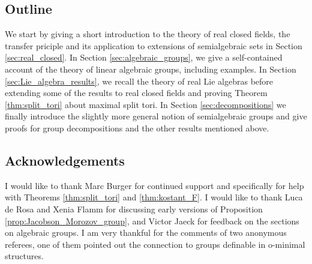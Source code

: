 \documentclass[12pt]{amsart}
\numberwithin{equation}{section}
\theoremstyle{remark} %
\begin{document}
	
	\subsection{Outline}
	We start by giving a short introduction to the theory of real closed fields, the transfer priciple and its application to extensions of semialgebraic sets in Section \ref{sec:real_closed}. In Section \ref{sec:algebraic_groups}, we give a self-contained account of the theory of linear algebraic groups, including examples. In Section \ref{sec:Lie_algebra_results}, we recall the theory of real Lie algebras before extending some of the results to real closed fields and proving Theorem \ref{thm:split_tori} about maximal split tori. In Section \ref{sec:decompositions} we finally introduce the slightly more general notion of semialgebraic groups and give proofs for group decompositions and the other results mentioned above. 
	

	\subsection{Acknowledgements}
	
	I would like to thank Marc Burger for continued support and specifically for help with Theorems \ref{thm:split_tori} and \ref{thm:kostant_F}. I would like to thank Luca de Rosa and Xenia Flamm for discussing early versions of Proposition \ref{prop:Jacobson_Morozov_group}, and Victor Jaeck for feedback on the sections on algebraic groups. I am very thankful for the comments of two anonymous referees, one of them pointed out the connection to groups definable in o-minimal structures.
	
	
	
	
	
	
	
	

 
 
\end{document}
